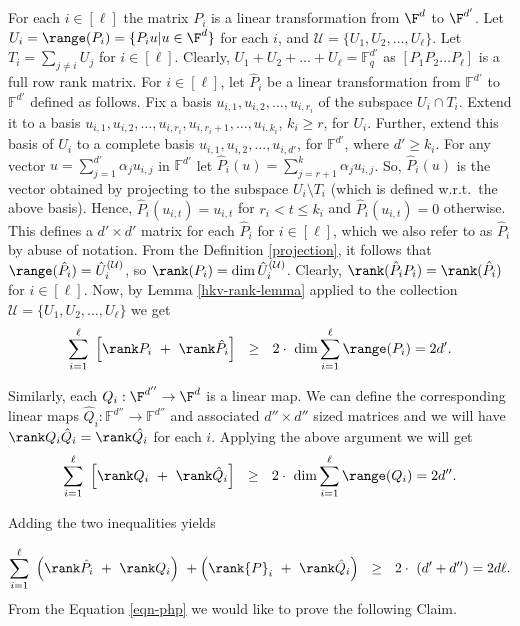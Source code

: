 For each $i\in [\ell]$ the matrix $P_i$ is a linear transformation
from $\F^d$ to $\F^{d'}$. Let $U_i= \range(P_i)=\{P_i u | u \in
\F^{d}\}$ for each $i$, and $\mathcal{U}= \{U_1, U_2, \ldots, U_{\ell}
\}$. Let $T_i = \sum _{j \neq i} U_j$ for $i\in [\ell]$. Clearly,
$U_1+ U_2 + \ldots + U_\ell= \mathbb{F}_q^{d'}$ as $[ P_1 P_2\ldots
  P_\ell]$ is a full row rank matrix. For $i\in[\ell]$, let
$\hat{P}_i$ be a linear transformation from $\mathbb{F}^{d'}$ to
$\mathbb{F}^{d'}$ defined as follows. Fix a basis $u_{i,1}, u_{i,2},
\ldots, u_{i,r_i}$ of the subspace $U_i \cap T_i$. Extend it to a
basis $u_{i,1}, u_{i,2}, \ldots, u_{i,r_i}, u_{i,r_i+1}, \ldots,
u_{i,k_i}$, $k_i \geq r$, for $U_i$. Further, extend this basis of
$U_i$ to a complete basis $u_{i,1}, u_{i,2}, \ldots, u_{i,d'}$, for
$\mathbb{F}^{d'}$, where $d' \geq k_i$. For any vector $u =
\sum_{j=1}^{d'} \alpha_j u_{i,j}$ in $\mathbb{F}^{d'}$ let $\hat{P}_i
(u) = \sum_{j=r+1}^k \alpha_j u_{i,j}$. So, $\hat{P}_i(u)$ is the
vector obtained by projecting to the subspace $U_i\setminus T_i$
(which is defined w.r.t.\ the above basis). Hence,
$\hat{P}_i(u_{i,t})= u_{i,t}$ for $r_i < t \leq k_i$ and
$\hat{P}_i(u_{i,t})= 0$ otherwise. This defines a $d' \times d'$
matrix for each $\hat{P}_i$ for $i \in [\ell]$, which we also refer to
as $\hat{P}_i$ by abuse of notation. From the Definition
\ref{projection}, it follows that $\range(\hat{P}_i) =
\hat{U}_i^{(\mathcal{U})}$, so $\rank(P_i)=\dim
\hat{U}_i^{(\mathcal{U})}$.  Clearly, $\rank(\hat{P}_i P_i) =
\rank(\hat{P}_i)$ for $i \in [\ell]$. Now, by Lemma
\ref{hkv-rank-lemma} applied to the collection $\mathcal{U}= \{U_1,
U_2, \ldots, U_{\ell} \}$ we get
\[
\sum_{i=1}^{\ell}~ \left[ \rank P_i ~+~ \rank \hat{P}_i \right]~~ \geq
~~ 2\cdot ~ \dim \sum_{i=1}^{\ell} \range(P_i) = 2d'.
\]      

Similarly, each $Q_i:\F^{d''}\to \F^d$ is a linear map. We can define
the corresponding linear maps $\hat{Q}_i : \mathbb{F}^{d''} \to
\mathbb{F}^{d''}$ and associated $d'' \times d''$ sized matrices and
we will have $\rank Q_i\hat{Q}_i = \rank \hat{Q_i}$ for each
$i$. Applying the above argument we will get
 \[
\sum_{i=1}^{\ell}~ \left[ \rank Q_i ~+~ \rank \hat{Q}_i \right]~~ \geq
~~ 2\cdot ~ \dim \sum_{i=1}^{\ell} \range(Q_i) = 2d''.
\] 

Adding the two inequalities yields

\begin{equation}\label{eqn-php}
\sum_{i=1}^{\ell}~ \left( \rank \hat{P}_i ~+~ \rank Q_i \right)~ +  \left( \rank {P}_i ~+~ \rank \hat{Q}_i \right) ~~\geq ~~ 2\cdot ~ (d'+d'')= 2d\ell.
\end{equation}
From the Equation \ref{eqn-php} we would like to prove the following Claim.

